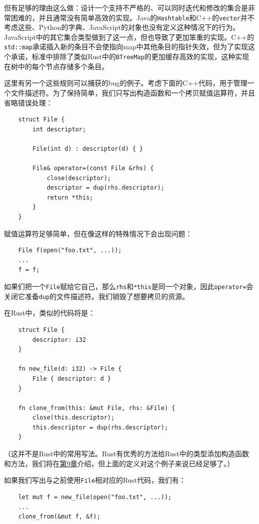 但有足够的理由这么做：设计一个支持不严格的、可以同时迭代和修改的集合是非常困难的，并且通常没有简单高效的实现。Java的\texttt{Hashtable}和C++的\texttt{vector}并不考虑这些、Python的字典、JavaScript的对象也没有定义这种情况下的行为。JavaScript中的其它集合类型做到了这一点，但也导致了更加笨重的实现。C++的\texttt{std::map}承诺插入新的条目不会使指向map中其他条目的指针失效，但为了实现这个承诺，标准中排除了类似Rust中的\texttt{BTreeMap}的更加缓存高效的实现，这种实现在树中的每个节点存储多个条目。

这里有另一个这些规则可以捕获的bug的例子。考虑下面的C++代码，用于管理一个文件描述符。为了保持简单，我们只写出构造函数和一个拷贝赋值运算符，并且省略错误处理：
\begin{verbatim}
    struct File {
        int descriptor;

        File(int d) : descriptor(d) { }

        File& operator=(const File &rhs) {
            close(descriptor);
            descriptor = dup(rhs.descriptor);
            return *this;
        }
    }
\end{verbatim}

赋值运算符足够简单，但在像这样的特殊情况下会出现问题：
\begin{verbatim}
    File f(open("foo.txt", ...));
    ...
    f = f;
\end{verbatim}

如果们把一个\texttt{File}赋给它自己，那么\texttt{rhs}和\texttt{*this}是同一个对象，因此\texttt{operator=}会关闭它准备\texttt{dup}的文件描述符。我们销毁了想要拷贝的资源。

在Rust中，类似的代码将是：
\begin{verbatim}
    struct File {
        descriptor: i32
    }

    fn new_file(d: i32) -> File {
        File { descriptor: d }
    }

    fn clone_from(this: &mut File, rhs: &File) {
        close(this.descriptor);
        this.descriptor = dup(rhs.descriptor);
    }
\end{verbatim}
（这并不是Rust中的常用写法。Rust有优秀的方法给Rust中的类型添加构造函数和方法，我们将在\hyperref[ch09]{第9章}介绍，但上面的定义对这个例子来说已经足够了。）

如果我们写出与之前使用\texttt{File}相对应的Rust代码，我们有：
\begin{verbatim}
    let mut f = new_file(open("foo.txt", ...));
    ...
    clone_from(&mut f, &f);
\end{verbatim}


